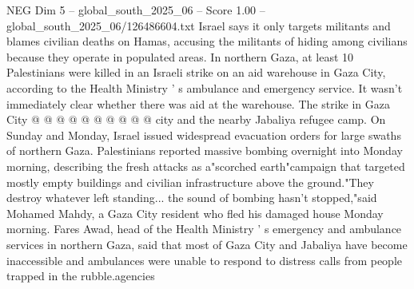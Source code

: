 \begin{textsample}{NEG Dim 5 – global\_south\_2025\_06 – Score 1.00 – global\_south\_2025\_06/126486604.txt}
Israel says it only targets militants and blames civilian deaths on Hamas, accusing the militants of hiding among civilians because they operate in populated areas.
In northern Gaza, at least 10 Palestinians were killed in an Israeli strike on an aid warehouse in Gaza City, according to the Health Ministry ' s ambulance and emergency service.
It wasn't immediately clear whether there was aid at the warehouse.
The strike in Gaza City @ @ @ @ @ @ @ @ @ @ city and the nearby Jabaliya refugee camp.
On Sunday and Monday, Israel issued widespread evacuation orders for large swaths of northern Gaza.
Palestinians reported massive bombing overnight into Monday morning, describing the fresh attacks as a"scorched earth"campaign that targeted mostly empty buildings and civilian infrastructure above the ground."They destroy whatever left standing... the sound of bombing hasn't stopped,"said Mohamed Mahdy, a Gaza City resident who fled his damaged house Monday morning.
Fares Awad, head of the Health Ministry ' s emergency and ambulance services in northern Gaza, said that most of Gaza City and Jabaliya have become inaccessible and ambulances were unable to respond to distress calls from people trapped in the rubble.agencies

\end{textsample}
